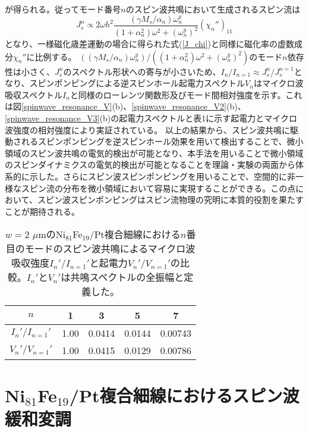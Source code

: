 が得られる。従ってモード番号$n$のスピン波共鳴において生成されるスピン流は
\begin{equation}
J_s^n\propto  2\omega {h^2}  {\frac{{(\gamma {M_s}/{\alpha _n})\omega _n^y}}{{(1 + \alpha _n^2){\omega ^2} + {{(\omega _n^y)}^2}}}} {(\chi _n'')_{11}} 
\end{equation}
となり、一様磁化歳差運動の場合に得られた式(\ref{J_chi})と同様に磁化率の虚数成分$\chi_n''$に比例する。
$((\gamma {M_s}/{\alpha _n})\omega _n^y)/((1 + \alpha _n^2){\omega ^2} + {{(\omega _n^y)}^2}) $のモード$n$依存性は小さく、$J_s^n$のスペクトル形状への寄与が小さいため、$I_n/I_{n=1}\approx J_s^n/J_s^{n=1}$となり、スピンポンピングによる逆スピンホール起電力スペクトル$V_n$はマイクロ波吸収スペクトル$I_n$と同様のローレンツ関数形及びモード間相対強度を示す。これは図\ref{spinwave_resonance_V}(b)、\ref{spinwave_resonance_V2}(b)、\ref{spinwave_resonance_V3}(b)の起電力スペクトルと表1に示す起電力とマイクロ波強度の相対強度により実証されている。
以上の結果から、スピン波共鳴に駆動されるスピンポンピングを逆スピンホール効果を用いて検出することで、微小領域のスピン波共鳴の電気的検出が可能となり、本手法を用いることで微小領域のスピンダイナミクスの電気的検出が可能となることを理論・実験の両面から体系的に示した。さらにスピン波スピンポンピングを用いることで、空間的に非一様なスピン流の分布を微小領域において容易に実現することができる。この点において、スピン波スピンポンピングはスピン流物理の究明に本質的役割を果たすことが期待される。

\begin{table}
 \begin{center}
\caption{$w=2$ $\mu$mのNi$_{81}$Fe$_{19}$/Pt複合細線における$n$番目のモードのスピン波共鳴によるマイクロ波吸収強度$I_n'/I_{n=1}'$と起電力$V_n'/V_{n=1}'$の比較。$I_n'$と$V_n'$は共鳴スペクトルの全振幅と定義した。}
\begin{tabular}{ccccc}
\hline\hline
$n$&1&3&5&7\\
\hline
$I_n'/I_{n=1}'$&1.00&0.0414&0.0144&0.00743 \\
$V_n'/V_{n=1}'$&1.00&0.0415&0.0129&0.00786\\
\hline\hline
\end{tabular}
\label{spinwave_V_FMR_compare}
 \end{center}
\end{table}








\section{Ni$_{81}$Fe$_{19}$/Pt複合細線におけるスピン波緩和変調}
